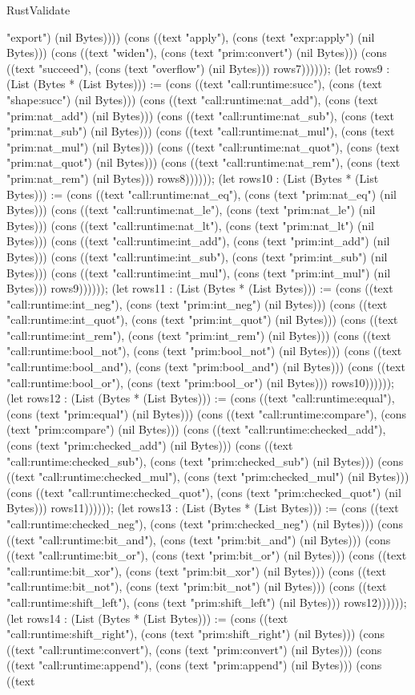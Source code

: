 \begin{lexlean}{RustValidate}
\begin{semanticmodule}
{"export") (nil Bytes)))) (cons ((text "apply"), (cons (text "expr:apply") (nil Bytes))) (cons ((text "widen"), (cons (text "prim:convert") (nil Bytes))) (cons ((text "succeed"), (cons (text "overflow") (nil Bytes))) rows7)))))); (let rows9 : (List (Bytes * (List Bytes))) := (cons ((text "call:runtime:succ"), (cons (text "shape:succ") (nil Bytes))) (cons ((text "call:runtime:nat_add"), (cons (text "prim:nat_add") (nil Bytes))) (cons ((text "call:runtime:nat_sub"), (cons (text "prim:nat_sub") (nil Bytes))) (cons ((text "call:runtime:nat_mul"), (cons (text "prim:nat_mul") (nil Bytes))) (cons ((text "call:runtime:nat_quot"), (cons (text "prim:nat_quot") (nil Bytes))) (cons ((text "call:runtime:nat_rem"), (cons (text "prim:nat_rem") (nil Bytes))) rows8)))))); (let rows10 : (List (Bytes * (List Bytes))) := (cons ((text "call:runtime:nat_eq"), (cons (text "prim:nat_eq") (nil Bytes))) (cons ((text "call:runtime:nat_le"), (cons (text "prim:nat_le") (nil Bytes))) (cons ((text "call:runtime:nat_lt"), (cons (text "prim:nat_lt") (nil Bytes))) (cons ((text "call:runtime:int_add"), (cons (text "prim:int_add") (nil Bytes))) (cons ((text "call:runtime:int_sub"), (cons (text "prim:int_sub") (nil Bytes))) (cons ((text "call:runtime:int_mul"), (cons (text "prim:int_mul") (nil Bytes))) rows9)))))); (let rows11 : (List (Bytes * (List Bytes))) := (cons ((text "call:runtime:int_neg"), (cons (text "prim:int_neg") (nil Bytes))) (cons ((text "call:runtime:int_quot"), (cons (text "prim:int_quot") (nil Bytes))) (cons ((text "call:runtime:int_rem"), (cons (text "prim:int_rem") (nil Bytes))) (cons ((text "call:runtime:bool_not"), (cons (text "prim:bool_not") (nil Bytes))) (cons ((text "call:runtime:bool_and"), (cons (text "prim:bool_and") (nil Bytes))) (cons ((text "call:runtime:bool_or"), (cons (text "prim:bool_or") (nil Bytes))) rows10)))))); (let rows12 : (List (Bytes * (List Bytes))) := (cons ((text "call:runtime:equal"), (cons (text "prim:equal") (nil Bytes))) (cons ((text "call:runtime:compare"), (cons (text "prim:compare") (nil Bytes))) (cons ((text "call:runtime:checked_add"), (cons (text "prim:checked_add") (nil Bytes))) (cons ((text "call:runtime:checked_sub"), (cons (text "prim:checked_sub") (nil Bytes))) (cons ((text "call:runtime:checked_mul"), (cons (text "prim:checked_mul") (nil Bytes))) (cons ((text "call:runtime:checked_quot"), (cons (text "prim:checked_quot") (nil Bytes))) rows11)))))); (let rows13 : (List (Bytes * (List Bytes))) := (cons ((text "call:runtime:checked_neg"), (cons (text "prim:checked_neg") (nil Bytes))) (cons ((text "call:runtime:bit_and"), (cons (text "prim:bit_and") (nil Bytes))) (cons ((text "call:runtime:bit_or"), (cons (text "prim:bit_or") (nil Bytes))) (cons ((text "call:runtime:bit_xor"), (cons (text "prim:bit_xor") (nil Bytes))) (cons ((text "call:runtime:bit_not"), (cons (text "prim:bit_not") (nil Bytes))) (cons ((text "call:runtime:shift_left"), (cons (text "prim:shift_left") (nil Bytes))) rows12)))))); (let rows14 : (List (Bytes * (List Bytes))) := (cons ((text "call:runtime:shift_right"), (cons (text "prim:shift_right") (nil Bytes))) (cons ((text "call:runtime:convert"), (cons (text "prim:convert") (nil Bytes))) (cons ((text "call:runtime:append"), (cons (text "prim:append") (nil Bytes))) (cons ((text }
\end{semanticmodule}
\end{lexlean}
